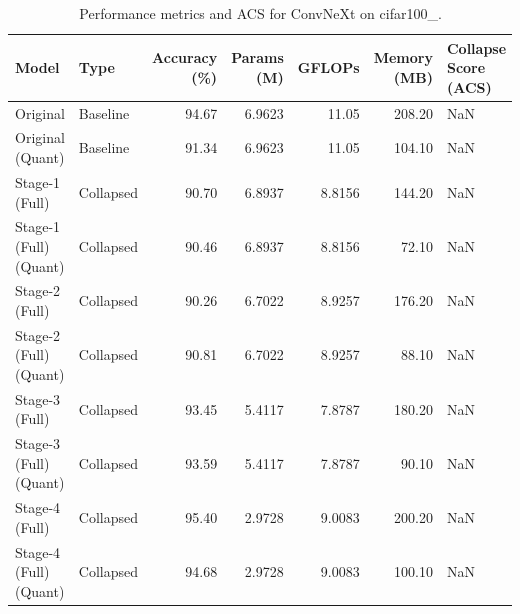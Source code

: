 \begin{table}
\caption{Performance metrics and ACS for ConvNeXt on cifar100_.}
\label{tab:ConvNeXt_cifar100_}
\begin{tabular}{llrrrrl}
\toprule
Model & Type & Accuracy (\%) & Params (M) & GFLOPs & Memory (MB) & Collapse Score (ACS) \\
\midrule
Original & Baseline & 94.67 & 6.9623 & 11.05 & 208.20 & NaN \\
Original
(Quant) & Baseline & 91.34 & 6.9623 & 11.05 & 104.10 & NaN \\
Stage-1 (Full) & Collapsed & 90.70 & 6.8937 & 8.8156 & 144.20 & NaN \\
Stage-1 (Full)
(Quant) & Collapsed & 90.46 & 6.8937 & 8.8156 & 72.10 & NaN \\
Stage-2 (Full) & Collapsed & 90.26 & 6.7022 & 8.9257 & 176.20 & NaN \\
Stage-2 (Full)
(Quant) & Collapsed & 90.81 & 6.7022 & 8.9257 & 88.10 & NaN \\
Stage-3 (Full) & Collapsed & 93.45 & 5.4117 & 7.8787 & 180.20 & NaN \\
Stage-3 (Full)
(Quant) & Collapsed & 93.59 & 5.4117 & 7.8787 & 90.10 & NaN \\
Stage-4 (Full) & Collapsed & 95.40 & 2.9728 & 9.0083 & 200.20 & NaN \\
Stage-4 (Full)
(Quant) & Collapsed & 94.68 & 2.9728 & 9.0083 & 100.10 & NaN \\
\bottomrule
\end{tabular}
\end{table}
